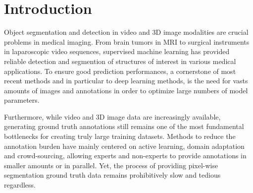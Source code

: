\chapter{Introduction} %

\label{intro} %

Object segmentation and detection in video and 3D image modalities are crucial problems in medical imaging. From brain tumors in MRI to surgical instruments in laparoscopic video sequences, supervised machine learning has provided reliable detection and segmention of structures of interest in various medical applications. To ensure good prediction performances, a cornerstone of most recent methods and in particular to deep learning methods, is the need for vasts amounts of images and annotations in order to optimize large numbers of model parameters.

Furthermore, while video and 3D image data are increasingly available, generating
ground truth annotations still remains one of the most fundamental bottlenecks
for creating truly large training datasets. Methods to reduce the annotation
burden have mainly centered on active learning,
domain adaptation and
crowd-sourcing, allowing experts and
non-experts to provide annotations in smaller amounts or in parallel. Yet, the
process of providing pixel-wise segmentation ground truth data remains prohibitively slow and tedious regardless.


